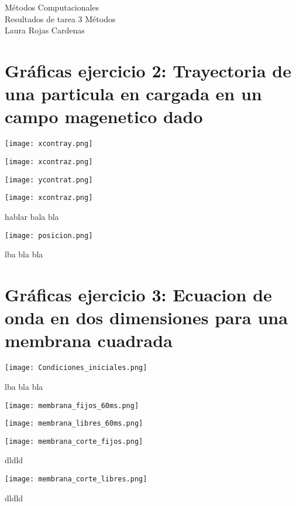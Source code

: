 \documentclass[11pt,letterpaper]{exam}
\begin{document}
\begin{center}
{\Large Métodos Computacionales} \\
Resultados de tarea 3 Métodos \\ 
Laura Rojas Cardenas\\
\end{center}


\noindent
\section{Gr\'aficas ejercicio 2: Trayectoria de una particula en cargada en un campo magenetico dado }
\begin{center}
\texttt{[image: xcontray.png]} 
\end{center}

\begin{center}
\texttt{[image: xcontraz.png]} 
\end{center}

\begin{center}
\texttt{[image: ycontrat.png]} 
\end{center}

\begin{center}
\texttt{[image: xcontraz.png]} 
\end{center}
hablar bala bla

\begin{center}
\texttt{[image: posicion.png]} 
\end{center}
lba bla bla 



\section{Gr\'aficas ejercicio 3: Ecuacion de onda en dos dimensiones para una membrana cuadrada}

\begin{center}
\texttt{[image: Condiciones\_iniciales.png]} 
\end{center}
lba bla bla 

\begin{center}
\texttt{[image: membrana\_fijos\_60ms.png]} 
\end{center}

\begin{center}
\texttt{[image: membrana\_libres\_60ms.png]} 
\end{center}

\begin{center}
\texttt{[image: membrana\_corte\_fijos.png]} 
\end{center}
dldld 

\begin{center}
\texttt{[image: membrana\_corte\_libres.png]} 
\end{center}
dldld 
\end{document}
